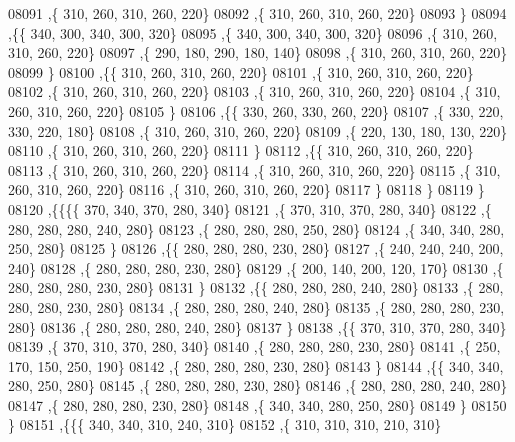\begin{DoxyCode}
08091     ,\{   310,   260,   310,   260,   220\}
08092     ,\{   310,   260,   310,   260,   220\}
08093     \}
08094    ,\{\{   340,   300,   340,   300,   320\}
08095     ,\{   340,   300,   340,   300,   320\}
08096     ,\{   310,   260,   310,   260,   220\}
08097     ,\{   290,   180,   290,   180,   140\}
08098     ,\{   310,   260,   310,   260,   220\}
08099     \}
08100    ,\{\{   310,   260,   310,   260,   220\}
08101     ,\{   310,   260,   310,   260,   220\}
08102     ,\{   310,   260,   310,   260,   220\}
08103     ,\{   310,   260,   310,   260,   220\}
08104     ,\{   310,   260,   310,   260,   220\}
08105     \}
08106    ,\{\{   330,   260,   330,   260,   220\}
08107     ,\{   330,   220,   330,   220,   180\}
08108     ,\{   310,   260,   310,   260,   220\}
08109     ,\{   220,   130,   180,   130,   220\}
08110     ,\{   310,   260,   310,   260,   220\}
08111     \}
08112    ,\{\{   310,   260,   310,   260,   220\}
08113     ,\{   310,   260,   310,   260,   220\}
08114     ,\{   310,   260,   310,   260,   220\}
08115     ,\{   310,   260,   310,   260,   220\}
08116     ,\{   310,   260,   310,   260,   220\}
08117     \}
08118    \}
08119   \}
08120  ,\{\{\{\{   370,   340,   370,   280,   340\}
08121     ,\{   370,   310,   370,   280,   340\}
08122     ,\{   280,   280,   280,   240,   280\}
08123     ,\{   280,   280,   280,   250,   280\}
08124     ,\{   340,   340,   280,   250,   280\}
08125     \}
08126    ,\{\{   280,   280,   280,   230,   280\}
08127     ,\{   240,   240,   240,   200,   240\}
08128     ,\{   280,   280,   280,   230,   280\}
08129     ,\{   200,   140,   200,   120,   170\}
08130     ,\{   280,   280,   280,   230,   280\}
08131     \}
08132    ,\{\{   280,   280,   280,   240,   280\}
08133     ,\{   280,   280,   280,   230,   280\}
08134     ,\{   280,   280,   280,   240,   280\}
08135     ,\{   280,   280,   280,   230,   280\}
08136     ,\{   280,   280,   280,   240,   280\}
08137     \}
08138    ,\{\{   370,   310,   370,   280,   340\}
08139     ,\{   370,   310,   370,   280,   340\}
08140     ,\{   280,   280,   280,   230,   280\}
08141     ,\{   250,   170,   150,   250,   190\}
08142     ,\{   280,   280,   280,   230,   280\}
08143     \}
08144    ,\{\{   340,   340,   280,   250,   280\}
08145     ,\{   280,   280,   280,   230,   280\}
08146     ,\{   280,   280,   280,   240,   280\}
08147     ,\{   280,   280,   280,   230,   280\}
08148     ,\{   340,   340,   280,   250,   280\}
08149     \}
08150    \}
08151   ,\{\{\{   340,   340,   310,   240,   310\}
08152     ,\{   310,   310,   310,   210,   310\}

\end{DoxyCode}
